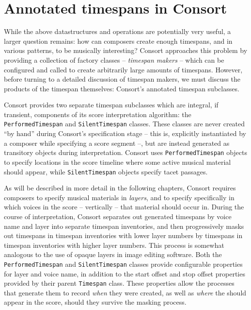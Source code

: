 \section{Annotated timespans in Consort}

While the above datastructures and operations are potentially very useful, a
larger question remains: how can composers create enough timespans, and in
various patterns, to be musically interesting? Consort approaches this problem
by providing a collection of factory classes -- \emph{timespan makers} -- which
can be configured and called to create arbitrarily large amounts of timespans.
However, before turning to a detailed discussion of timespan makers, we must
discuss the products of the timespan themselves: Consort's annotated timespan
subclasses.

Consort provides two separate timespan subclasses which are integral, if
transient, components of its score interpretation algorithm: the
\texttt{PerformedTimespan} and \texttt{SilentTimespan} classes. These classes
are never created \enquote{by hand} during Consort's specification stage --
this is, explicitly instantiated by a composer while specifying a score segment
--, but are instead generated as transitory objects during interpretation.
Consort uses \texttt{PerformedTimespan} objects to specify locations in the
score timeline where some active musical material should appear, while
\texttt{SilentTimespan} objects specify tacet passages.

As will be described in more detail in the following chapters, Consort requires
composers to specify musical materials in \emph{layers}, and to specify
specifically in which voices in the score -- vertically -- that material should
occur in. During the course of interpretation, Consort separates out generated
timespans by voice name and layer into separate timespan inventories, and then
progressively masks out timespans in timespan inventories with lower layer
numbers by timespans in timespan inventories with higher layer numbers. This
process is somewhat analogous to the use of opaque layers in image editing
software. Both the \texttt{PerformedTimespan} and \texttt{SilentTimespan}
classes provide configurable properties for layer and voice name, in addition
to the start offset and stop offset properties provided by their parent
\texttt{Timespan} class. These properties allow the processes that generate
them to record \emph{when} they were created, as well as \emph{where} the
should appear in the score, should they survive the masking process.

